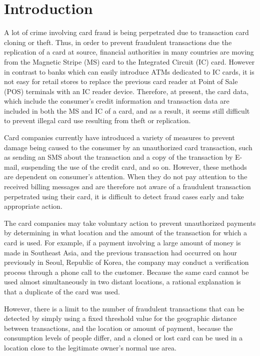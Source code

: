 \documentclass[final,authoryear,5p,times,twocolumn]{elsarticle}
\begin{document}
\section{Introduction}
\label{section:Sec1}
A lot of crime involving card fraud is being perpetrated due to transaction card cloning or theft. Thus, in order to prevent fraudulent transactions due the replication of a card at source, financial authorities in many countries are moving from the Magnetic Stripe (MS) card to the Integrated Circuit (IC) card. However in contrast to banks which can easily introduce ATMs dedicated to IC cards, it is not easy for retail stores to replace the previous card reader at Point of Sale (POS) terminals with an IC reader device. Therefore, at present, the card data, which include the consumer's credit information and transaction data are included in both the MS and IC of a card, and as a result, it seems still difficult to prevent illegal card use resulting from theft or replication.

Card companies currently have introduced a variety of measures to prevent damage being caused to the consumer by an unauthorized card transaction, such as sending an SMS about the transaction and a copy of the transaction by E-mail, suspending the use of the credit card, and so on. However, these methods are dependent on consumer's attention. When they do not pay attention to the received billing messages and are therefore not aware of a fraudulent transaction perpetrated using their card, it is difficult to detect fraud cases early and take appropriate action.

The card companies may take voluntary action to prevent unauthorized payments by determining in what location and the amount of the transaction for which a card is used. For example, if a payment involving a large amount of money is made in Southeast Asia, and the previous transaction had occurred on hour previously in Seoul, Republic of Korea, the company may conduct a verification process through a phone call to the customer. Because the same card cannot be used almost simultaneously in two distant locations, a rational explanation is that a duplicate of the card was used.

However, there is a limit to the number of fraudulent transactions that can be detected by simply using a fixed threshold value for the geographic distance between transactions, and the location or amount of payment, because the consumption levels of people differ, and a cloned or lost card can be used in a location close to the legitimate owner's normal use area.
\end{document}
